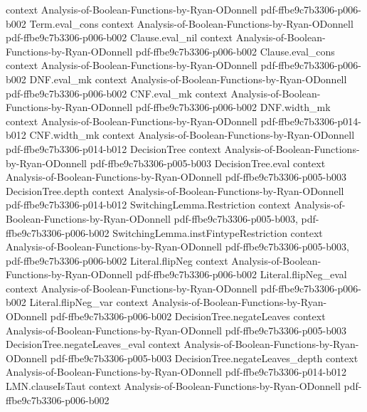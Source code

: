 \begin{lemma}
  {context}
  {Analysis-of-Boolean-Functions-by-Ryan-ODonnell}
  {pdf-ffbe9c7b3306-p006-b002}
\proofstep
  {Term.eval_cons}
  {context}
  {Analysis-of-Boolean-Functions-by-Ryan-ODonnell}
  {pdf-ffbe9c7b3306-p006-b002}
\proofstep
  {Clause.eval_nil}
  {context}
  {Analysis-of-Boolean-Functions-by-Ryan-ODonnell}
  {pdf-ffbe9c7b3306-p006-b002}
\proofstep
  {Clause.eval_cons}
  {context}
  {Analysis-of-Boolean-Functions-by-Ryan-ODonnell}
  {pdf-ffbe9c7b3306-p006-b002}
\proofstep
  {DNF.eval_mk}
  {context}
  {Analysis-of-Boolean-Functions-by-Ryan-ODonnell}
  {pdf-ffbe9c7b3306-p006-b002}
\proofstep
  {CNF.eval_mk}
  {context}
  {Analysis-of-Boolean-Functions-by-Ryan-ODonnell}
  {pdf-ffbe9c7b3306-p006-b002}
\proofstep
  {DNF.width_mk}
  {context}
  {Analysis-of-Boolean-Functions-by-Ryan-ODonnell}
  {pdf-ffbe9c7b3306-p014-b012}
\proofstep
  {CNF.width_mk}
  {context}
  {Analysis-of-Boolean-Functions-by-Ryan-ODonnell}
  {pdf-ffbe9c7b3306-p014-b012}
\proofstep
  {DecisionTree}
  {context}
  {Analysis-of-Boolean-Functions-by-Ryan-ODonnell}
  {pdf-ffbe9c7b3306-p005-b003}
\proofstep
  {DecisionTree.eval}
  {context}
  {Analysis-of-Boolean-Functions-by-Ryan-ODonnell}
  {pdf-ffbe9c7b3306-p005-b003}
\proofstep
  {DecisionTree.depth}
  {context}
  {Analysis-of-Boolean-Functions-by-Ryan-ODonnell}
  {pdf-ffbe9c7b3306-p014-b012}
\proofstep
  {SwitchingLemma.Restriction}
  {context}
  {Analysis-of-Boolean-Functions-by-Ryan-ODonnell}
  {pdf-ffbe9c7b3306-p005-b003,
    pdf-ffbe9c7b3306-p006-b002}
\proofstep
  {SwitchingLemma.instFintypeRestriction}
  {context}
  {Analysis-of-Boolean-Functions-by-Ryan-ODonnell}
  {pdf-ffbe9c7b3306-p005-b003,
    pdf-ffbe9c7b3306-p006-b002}
\proofstep
  {Literal.flipNeg}
  {context}
  {Analysis-of-Boolean-Functions-by-Ryan-ODonnell}
  {pdf-ffbe9c7b3306-p006-b002}
\proofstep
  {Literal.flipNeg_eval}
  {context}
  {Analysis-of-Boolean-Functions-by-Ryan-ODonnell}
  {pdf-ffbe9c7b3306-p006-b002}
\proofstep
  {Literal.flipNeg_var}
  {context}
  {Analysis-of-Boolean-Functions-by-Ryan-ODonnell}
  {pdf-ffbe9c7b3306-p006-b002}
\proofstep
  {DecisionTree.negateLeaves}
  {context}
  {Analysis-of-Boolean-Functions-by-Ryan-ODonnell}
  {pdf-ffbe9c7b3306-p005-b003}
\proofstep
  {DecisionTree.negateLeaves_eval}
  {context}
  {Analysis-of-Boolean-Functions-by-Ryan-ODonnell}
  {pdf-ffbe9c7b3306-p005-b003}
\proofstep
  {DecisionTree.negateLeaves_depth}
  {context}
  {Analysis-of-Boolean-Functions-by-Ryan-ODonnell}
  {pdf-ffbe9c7b3306-p014-b012}
\proofstep
  {LMN.clauseIsTaut}
  {context}
  {Analysis-of-Boolean-Functions-by-Ryan-ODonnell}
  {pdf-ffbe9c7b3306-p006-b002}

\end{lemma}
